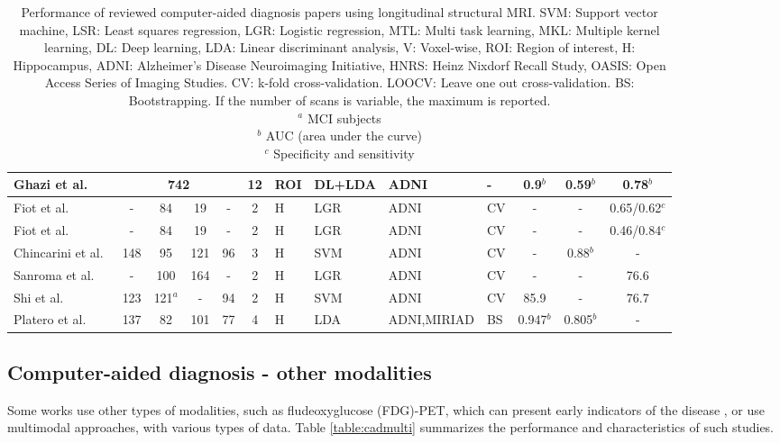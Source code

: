 \begin{table}
{\begin{tabular}{@{}lcccccllllccc@{}}
Ghazi et al.\ \cite{Ghazi2019} & \multicolumn{4}{c}{742} & 12 & ROI & DL+LDA & ADNI & - & 0.9$^{b}$  & 0.59$^{b}$  & 0.78$^{b}$  \\ \midrule 
Fiot et al.\ \cite{Fiot2012} & - & 84 & 19 & - & 2 & H & LGR & ADNI & CV & - & - & 0.65/0.62$^{c}$ \\
Fiot et al.\ \cite{Fiot2014} & - & 84 & 19 & - & 2 & H & LGR & ADNI & CV & - & - & 0.46/0.84$^{c}$ \\
Chincarini et al.\ \cite{chincarini} & 148 & 95 & 121 & 96 & 3 & H & SVM & ADNI & CV & - & 0.88$^{b}$  & - \\ 
Sanroma et al.\ \cite{Sanroma2017}  & - & 100 & 164 & - & 2 & H & LGR & ADNI & CV & - & - & 76.6 \\
Shi et al.\ \cite{Shi2017} & 123 & 121$^{a}$ & - & 94 & 2 & H & SVM & ADNI & CV & 85.9 & - & 76.7 \\
Platero et al.\ \cite{Platero2019} & 137 & 82 & 101 & 77 & 4 & H & LDA & ADNI,MIRIAD & BS & 0.947$^{b}$ & 0.805$^{b}$ & - \\
 \bottomrule
\end{tabular}}
\caption[Performance of reviewed computer-aided diagnosis papers using longitudinal structural MRI.]{\footnotesize Performance of reviewed computer-aided diagnosis papers using longitudinal structural MRI. SVM: Support vector machine, LSR: Least squares regression, LGR: Logistic regression, MTL: Multi task learning, MKL: Multiple kernel learning, DL: Deep learning, LDA: Linear discriminant analysis, V: Voxel-wise, ROI: Region of interest, H: Hippocampus, ADNI: Alzheimer’s Disease Neuroimaging Initiative, HNRS: Heinz Nixdorf Recall Study, OASIS: Open Access Series of Imaging Studies. CV: k-fold cross-validation. LOOCV: Leave one out cross-validation. BS: Bootstrapping. If the number of scans is variable, the maximum is reported. \\
         $^{a}$ MCI subjects \\
         $^{b}$ AUC (area under the curve) \\
         $^{c}$ Specificity and sensitivity \\}\label{table:cadmri}
\end{table}
\normalsize

\subsection{Computer-aided diagnosis - other modalities}

Some works use other types of modalities, such as fludeoxyglucose (FDG)-PET, which can present early indicators of the disease \cite{Jack2013}, or use multimodal approaches, with various types of data. Table \ref{table:cadmulti} summarizes the performance and characteristics of such studies. \\

